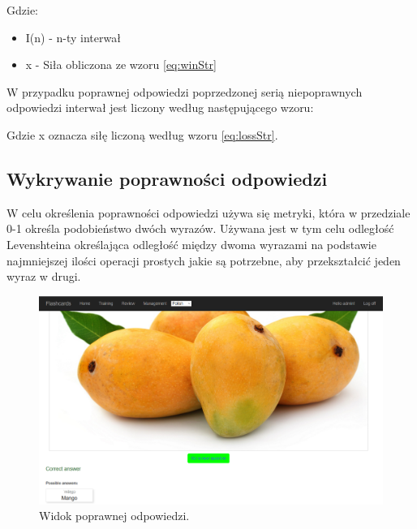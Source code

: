Gdzie:
\begin{itemize}
	\item I(n) - n-ty interwał
	\item x - Siła obliczona ze wzoru \ref{eq:winStr}
\end{itemize}

W przypadku poprawnej odpowiedzi poprzedzonej serią niepoprawnych odpowiedzi interwał jest liczony według następującego wzoru:



Gdzie x oznacza siłę liczoną według wzoru \ref{eq:lossStr}.

\subsection{Wykrywanie poprawności odpowiedzi}
\label{sec:similarity}
W celu określenia poprawności odpowiedzi używa się metryki, która w przedziale 0-1 określa podobieństwo dwóch wyrazów. Używana jest w tym celu odległość Levenshteina określająca odległość między dwoma wyrazami na podstawie najmniejszej ilości operacji prostych jakie są potrzebne, aby przekształcić jeden wyraz w drugi. \cite{Leve}

\begin{figure}[h]
	\centering
	\includegraphics[width=\textwidth]{images/rightAnswer.png}
	 \caption{Widok poprawnej odpowiedzi.}
\end{figure}

